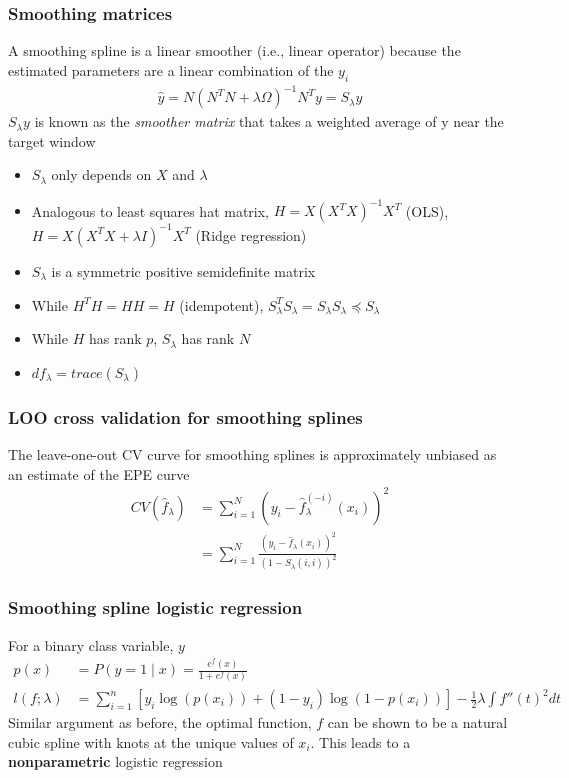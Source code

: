 \documentclass{article}
\begin{document}
\subsubsection{Smoothing matrices}
A smoothing spline is a linear smoother (i.e., linear operator) because the estimated parameters are a linear combination of the $y_i$
\begin{align*}
  \hat{y} = N(N^TN + \lambda \Omega)^{-1}N^Ty = S_\lambda y
\end{align*}
$S_\lambda y$ is known as the \textit{smoother matrix} that takes a weighted average of y near the target window
\begin{itemize}
  \item $S_\lambda$ only depends on $X$ and $\lambda$
  \item Analogous to least squares hat matrix, $H = X(X^TX)^{-1}X^T$ (OLS), $H = X(X^TX + \lambda I)^{-1}X^T$ (Ridge regression)
  \item $S_\lambda$ is a symmetric positive semidefinite matrix
  \item While $H^TH = HH = H$ (idempotent), $S_\lambda^TS_\lambda = S_\lambda S_\lambda \preceq S_\lambda$
  \item While $H$ has rank $p$, $S_\lambda$ has rank $N$
  \item $df_\lambda = trace(S_\lambda)$
\end{itemize}

\subsubsection{LOO cross validation for smoothing splines}
The leave-one-out CV curve for smoothing splines is approximately unbiased as an estimate of the EPE curve
\begin{align*}
  CV(\hat{f}_\lambda) &= \sum_{i=1}^N(y_i - \hat{f}^{(-i)}_\lambda(x_i))^2\\
  &= \sum_{i=1}^N\frac{(y_i - \hat{f}_\lambda(x_i))^2}{(1 - S_\lambda(i, i))^2}
\end{align*}

\subsubsection{Smoothing spline logistic regression}
For a binary class variable, $y$
\begin{align*}
  p(x) &= P(y=1 \mid x) = \frac{e^f(x)}{1 + e^f(x)}\\
  l(f;\lambda) &= \sum_{i=1}^n[y_i \log(p(x_i)) + (1-y_i)\log(1-p(x_i))] - \frac{1}{2}\lambda \int f''(t)^2dt
\end{align*}
Similar argument as before, the optimal function, $f$ can be shown to be a natural cubic spline with knots at the unique values of $x_i$. This leads to a \textbf{nonparametric} logistic regression
\end{document}
